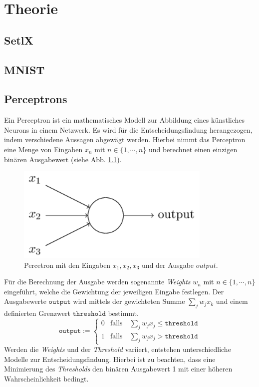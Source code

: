 \chapter{Theorie}

\section{SetlX}

\section{MNIST}

\section{Perceptrons}
Ein Perceptron ist ein mathematisches Modell zur Abbildung eines künstliches Neurons in einem Netzwerk. Es wird für die Entscheidungsfindung herangezogen, indem verschiedene Aussagen abgewägt werden. Hierbei nimmt das Perceptron eine Menge von Eingaben $x_n$ mit $n \in \{1, \cdots, n\}$ und berechnet einen einzigen binären Ausgabewert (siehe Abb. \ref{fig:perceptron}). 
\begin{figure}[hbt]
	\centering
	\includegraphics[scale=0.6]{Bilder/perceptron}
	\caption{Percetron mit den Eingaben $x_1, x_2, x_3$ und der Ausgabe $output$.} 
	\label{fig:perceptron} 
\end{figure}
\noindent
Für die Berechnung der Ausgabe werden sogenannte \textit{Weights} $w_n$ mit $n \in \{1, \cdots, n\}$ eingeführt, welche die Gewichtung der jeweiligen Eingabe festlegen. Der Ausgabewerte $\mathtt{output}$ wird mittels der gewichteten Summe $\sum_j w_j x_k$ und einem definierten Grenzwert $\mathtt{threshold}$ bestimmt.
\begin{equation}
	\mathtt{output} := \left\{
	\begin{array}{ll}
 		0 & \displaystyle \mbox{falls}\quad \sum\limits_j w_j x_j \leq \mathtt{threshold} \\[0.5cm]
 		1 & \displaystyle \mbox{falls}\quad \sum\limits_j w_j x_j > \mathtt{threshold}
	\end{array}\right.
\end{equation}
Werden die \textit{Weights} und der \textit{Threshold} variiert, entstehen unterschiedliche Modelle zur Entscheidungsfindung. Hierbei ist zu beachten, dass eine Minimierung des \textit{Thresholds} den binären Ausgabewert 1 mit einer höheren Wahrscheinlichkeit bedingt. \\


